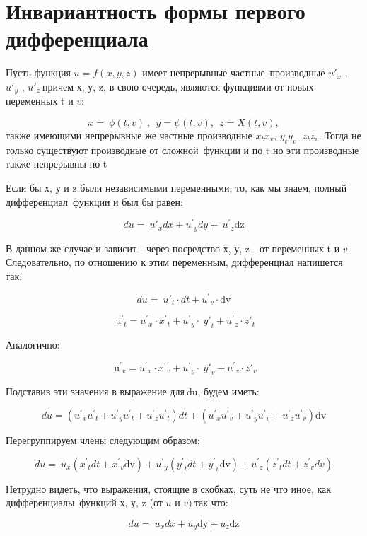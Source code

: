 \section{Инвариантность формы первого дифференциала}

Пусть функция $ u = f(x,y,z) $ имеет непрерывные частные~производные
$ {u'}_{x} $ , $ {u'}_{y} $ , $ {u'}_{z}\  $причем х, у, z, в свою
очередь, являются функциями от новых переменных t и $ v $:

$$ x = \ \phi\left( t,v \right)\ ,\ \ y = \psi\left( t,v \right),\ \ z = X\left( t,v \right), $$
также имеющими непрерывные же частные производные $ x_{t}x_{v}$, $y_{t}y_{v}$, $z_{t}z_{v} $. Тогда не только существуют производные от
сложной~функции и по t но эти производные также непрерывны по t

Если бы х, у и z были независимыми переменными, то, как мы знаем, полный
дифференциал~функции и был бы равен:

$$ du = \ {u'}_{x}dx + {u^{'}}_{y}dy + \ {u^{'}}_{z}\text{dz} $$

В данном же случае и зависит - через посредство х, у, z - от переменных
t и $ v $. Следовательно, по отношению к этим переменным, дифференциал
напишется так:

$$ du = \ {u'}_{t} \cdot dt + {u^{'}}_{v} \cdot \text{dv} $$

$$ {\text{\ \ u}^{'}}_{t} = {u^{'}}_{x} \cdot {x^{'}}_{t} + {u^{'}}_{y} \cdot \ {y'}_{t} + {u^{'}}_{z} \cdot {z'}_{t} $$

Аналогично:

$$ {\text{\ \ u}^{'}}_{v} = {u^{'}}_{x} \cdot {x^{'}}_{v} + {u^{'}}_{y} \cdot \ {y'}_{v} + {u^{'}}_{z} \cdot {z'}_{v} $$

Подставив эти значения в выражение для$ \ \text{du} $, будем иметь:

$$ du = \left( {u^{'}}_{x}{u^{'}}_{t} + {u^{'}}_{y}{u^{'}}_{t} + {u^{'}}_{z}{u^{'}}_{t} \right)dt + \left( {u^{'}}_{x}{u^{'}}_{v} + {u^{'}}_{y}{u^{'}}_{v} + {u^{'}}_{z}{u^{'}}_{v} \right)\text{dv} $$

Перегруппируем члены следующим образом:

$$ du = \ u_{x}\left( {x^{'}}_{t}dt + {x^{'}}_{v}\text{dv} \right) + {u^{'}}_{y}\left( {y^{'}}_{t}dt + {y^{'}}_{v}\text{dv} \right) + {u^{'}}_{z}({z^{'}}_{t}dt + {z^{'}}_{v}dv) $$

Нетрудно видеть, что выражения, стоящие в скобках, суть не что иное, как
дифференциалы~функций х, у, z (от $ u $ и $ v)\  $так что:

$$ du = \ u_{x}dx + u_{y}\text{dy} + u_{z}\text{dz} $$

